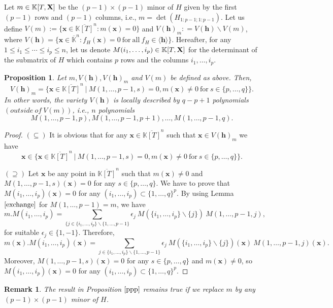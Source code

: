\documentclass[11pt]{article}
\numberwithin{Property}{section}
\numberwithin{Theorem}{section}
\newtheorem{Proposition}{Proposition}%
\numberwithin{Proposition}{section}
\numberwithin{Lemma}{section}
\numberwithin{Corollary}{section}
\numberwithin{Definition}{section}
\newtheorem{Remark}{Remark}%
\numberwithin{Remark}{section}
\numberwithin{Conjecture}{section}
\numberwithin{Problem}{section}
\numberwithin{Claim}{section}
\theoremstyle{definition}
\numberwithin{Example}{section}
\def\h {\ensuremath{\mathbf{h}}}
\renewcommand{\leq}{\leqslant}
\def\bar{\overline}
\newcommand{\field}{\mathbb{K}} %
\newcommand{\mat}[1]{\mathbf{\MakeUppercase{#1}}} %
\begin{document}
Let $m \in \field[T,\mat{X}]$ be the $(p-1) \times (p-1)$ minor of $H$ given by the first $(p-1)$ rows and $(p-1)$ columns, i.e., $m = \det(H_{1:p-1;1:p-1})$. Let us define $V(m) := \{\mathbf{x} \in \bar{\field[T]}^n : m(\mathbf{x}) = 0\}$ and $V(\h)_m : = V(\h) \backslash V(m)$, where $V(\h) = \{\mathbf{x} \in \bar{\field}^{n} : f_H(\mathbf{x}) = 0 \ \mathrm{for \ all} \ f_H \in \langle \h \rangle \}$. Hereafter, for any $1 \leq i_1 \leq \cdots \leq i_p \leq n$, let us denote $M(i_1, \ldots, i_p) \in \field[T,\mat{X}]$ for the determinant of the submatrix of $H$ which contains $p$ rows and the columns $i_1, \ldots, i_p$. 
\begin{Proposition} \label{ppp} Let $m, V(\h), V(\h)_m$ and $V(m)$ be defined as above. Then, 
\[
V(\h)_m = \{\mathbf{x} \in \bar{\field[T]}^n \ | \ M(1, \ldots, p-1, s) = 0, m(\mathbf{x}) \ne 0 \ \mathrm{for} \ s \in \{p, \ldots, q\} \}.
\] In other words, the variety $V(\h)$ is locally described by $q - p + 1$ polynomials $(outside \ of \ V(m))$, i.e., $n$ polynomials 
\[
M(1, \ldots, p-1, p), M(1, \ldots, p-1, p+	1), \ldots, M(1, \ldots, p-1, q).
\]
\end{Proposition}
\begin{proof}
$(\subseteq)$ It is obvious that for any $\mathbf{x} \in \bar{\field[T]}^n$ such that $\mathbf{x} \in V(\h)_m$ we have 
\[\mathbf{x} \in \{\mathbf{x} \in \bar{\field[T]}^n \ | \ M(1, \ldots, p-1, s) = 0, m(\mathbf{x}) \ne 0 \ \mathrm{for} \ s \in \{p, \ldots, q\} \}.\]

$(\supseteq)$ Let $\mathbf{x}$ be any point in $\bar{\field[T]}^n$ such that $m(\mathbf{x}) \ne 0$ and $M(1, \ldots, p-1, s)(\mathbf{x}) = 0$ for any $s \in \{p, \ldots, q\}$. We have to prove that $M(i_1, \ldots, i_p)(\mathbf{x}) = 0$ for any $(i_1, \ldots, i_p) \subset \{1, \ldots, q\}^p$. By using Lemma $\ref{exchange}$ for $M(1, \ldots, p-1) = m$, we have 
\[
m.M(i_1, \ldots, i_p) = \sum_{\{j \in \{i_1, \ldots, i_p\} \backslash \{1, \ldots, p-1 \} } \epsilon_j \ M(\{i_1, \ldots, i_p\} \backslash \{j\}) \ M(1, \ldots, p-1,j),
\] for suitable $\epsilon_j \in \{1,-1\}$. Therefore, 
\[
m(\mathbf{x}).M(i_1, \ldots, i_p)(\mathbf{x}) = \sum_{j \in \{i_1, \ldots, i_p\} \backslash \{1, \ldots, p-1 \} } \epsilon_j \ M(\{i_1, \ldots, i_p\} \backslash \{j\})(\mathbf{x}) \ M(1, \ldots, p-1,j)(\mathbf{x}). 
\] Moreover, $M(1, \ldots, p-1, s)(\mathbf{x}) = 0$ for any $s \in \{p, \ldots, q\}$ and $m(\mathbf{x}) \ne 0$, so $M(i_1, \ldots, i_p)(\mathbf{x}) = 0$ for any $(i_1, \ldots, i_p) \subset \{1, \ldots, q\}^p$. 

\end{proof}
\begin{Remark}The result in Proposition $\ref{ppp}$ remains true if we replace $m$ by any $(p-1) \times (p-1)$ minor of $H$. 
\end{Remark}
\end{document}
